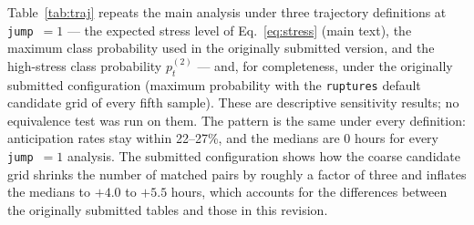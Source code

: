 \documentclass[preprint,12pt,authoryear]{elsarticle}
\newcommand{\dt}{$\Delta T$}
\providecommand{\DIFaddtex}[1]{{\protect\color{blue} \sf #1}} %
\providecommand{\DIFadd}[1]{\texorpdfstring{\DIFaddtex{#1}}{#1}} %
\begin{document}
\DIFadd{Table~\ref{tab:traj} repeats the main analysis under three trajectory
definitions at \texttt{jump}~$=1$ --- the expected stress level of
Eq.~\ref{eq:stress} (main text), the maximum class probability used in
the originally submitted version, and the high-stress class probability
$p_t^{(2)}$ --- and, for completeness, under the originally submitted
configuration (maximum probability with the \texttt{ruptures} default
candidate grid of every fifth sample). These are descriptive sensitivity results; no equivalence test was
run on them. The pattern is the same under every definition: anticipation rates stay within
22--27\%, and the medians are 0 hours for every \texttt{jump}~$=1$
analysis. The submitted configuration shows how the coarse candidate
grid shrinks the number of matched pairs by roughly a factor of three
and inflates the medians to $+4.0$ to $+5.5$ hours, which accounts for
the differences between the originally submitted tables and those in
this revision.
}

\begin{table}[h]
\centering
\caption{\dt{} under alternative trajectory definitions. Anticipation
is the repetition mean $\pm$ SD. All analyses use PELT with penalty 1.0
and the 72-hour window.}
\label{tab:traj}
\small
{}
\end{table}
\end{document}
